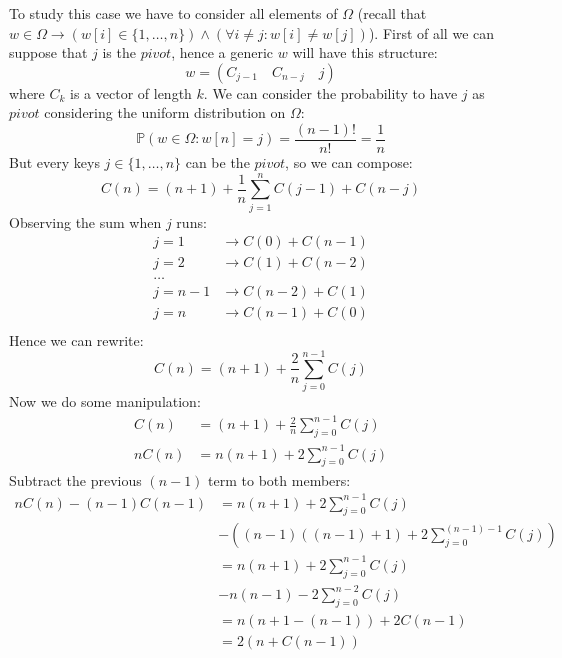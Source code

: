 To study this case we have to consider all
elements of $\Omega$ (recall that $w \in \Omega \rightarrow (w[i]\in
\{1,\ldots,n\}) \wedge (\forall i\not =j: w[i]\not=w[j])$). First of
all we can suppose that $j$ is the $pivot$, hence a generic $w$ will
have this structure:
\begin{displaymath}
  w = (C_{j-1} \quad C_{n-j} \quad j)
\end{displaymath}
where $C_k$ is a vector of length $k$. We can consider the
probability to have $j$ as $pivot$ considering the uniform
distribution on $\Omega$:
\begin{displaymath}
  \mathbb{P}\left(w\in\Omega: w[n]=j \right) =
  \frac{(n-1)!}{n!} =  \frac{1}{n} 
\end{displaymath}
But every keys $j \in \{1,\ldots,n\}$ can be the $pivot$, so we can
compose:
\begin{displaymath}
  C(n) = (n+1) +  \frac{1}{n}\sum_{j=1}^{n}{C(j-1) + C(n-j)} 
\end{displaymath}
Observing the sum when $j$ runs:
\begin{displaymath}
  \begin{split}
    j=1 &\rightarrow C(0) + C(n-1) \\
    j=2 &\rightarrow C(1) + C(n-2) \\
    \ldots& \\
    j=n-1 &\rightarrow C(n-2) + C(1) \\
    j=n &\rightarrow C(n-1) + C(0) \\
  \end{split}
\end{displaymath}
Hence we can rewrite:
\begin{displaymath}
  C(n) = (n+1) +  \frac{2}{n}\sum_{j=0}^{n-1}{C(j)} 
\end{displaymath}
Now we do some manipulation:
\begin{displaymath}
  \begin{split}
    C(n) &= (n+1) + \frac{2}{n}\sum_{j=0}^{n-1}{C(j)}\\
    nC(n) &= n(n+1) + 2\sum_{j=0}^{n-1}{C(j)}
  \end{split}
\end{displaymath}
Subtract the previous $(n-1)$ term to both members:
\begin{displaymath}
  \begin{split}
    nC(n) -(n-1)C(n-1) &= n(n+1) + 2\sum_{j=0}^{n-1}{C(j)} \\
    &-\left((n-1)((n-1)+1) + 2\sum_{j=0}^{(n-1)-1}{C(j)}\right) \\
    &= n(n+1) + 2\sum_{j=0}^{n-1}{C(j)} \\
    &-n(n-1) - 2\sum_{j=0}^{n-2}{C(j)} \\
    &= n(n+1-(n-1)) + 2C(n-1) \\
    &= 2(n + C(n-1)) \\      
  \end{split}
\end{displaymath}
